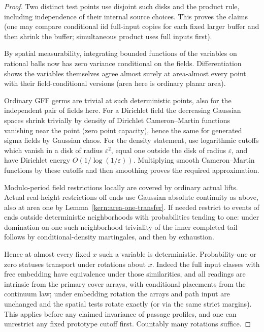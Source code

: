 \begin{proof}
Two distinct test points use disjoint such disks and the product rule, including independence of
their internal source choices. This proves the claims (one may compare conditional iid full-input
copies for each fixed larger buffer and then shrink the buffer; simultaneous product uses full
inputs first).

By spatial measurability, integrating bounded functions of the variables on rational balls now has
zero variance conditional on the fields. Differentiation shows the variables themselves agree almost
surely at area-almost every point with their field-conditional versions (area here is ordinary
planar area).

Ordinary GFF germs are trivial at such deterministic points, also for the independent pair of fields
here. For a Dirichlet field the decreasing Gaussian spaces shrink trivially by density of Dirichlet
Cameron–Martin functions vanishing near the point (zero point capacity), hence the same for
generated sigma fields by Gaussian chaos. For the density statement, use logarithmic cutoffs
which vanish in a disk of radius \(\varepsilon^2\), equal one outside the disk of radius
\(\varepsilon\), and have Dirichlet energy \(O(1/\log(1/\varepsilon))\). Multiplying smooth
Cameron--Martin functions by these cutoffs and then smoothing proves the required approximation.

Modulo-period field restrictions locally are covered by ordinary actual lifts. Actual real-height
restrictions off ends use Gaussian absolute continuity as above, also at area one by
Lemma~\ref{kern:area-one-transfer}. If needed restrict to events of ends outside deterministic
neighborhoods with probabilities tending to one: under domination on one such neighborhood
triviality of the inner completed tail follows by conditional-density martingales, and then by
exhaustion.

Hence at almost every fixed \(x\) such a variable is deterministic. Probability-one or zero statuses
transport under rotations about \(x\). Indeed the full input classes with free embedding have
equivalence under those similarities, and all readings are intrinsic from the primary cover arrays,
with conditional placements from the continuum law; under embedding rotation the arrays and path
input are unchanged and the spatial tests rotate exactly (or via the same strict margins). This
applies before any claimed invariance of passage profiles, and one can unrestrict any fixed
prototype cutoff first. Countably many rotations suffice.

\end{proof}

